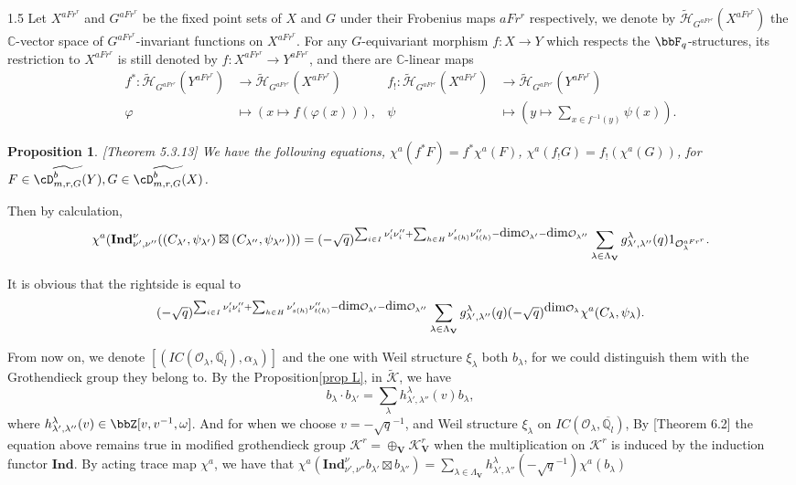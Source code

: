 \documentclass[10pt]{amsart}
\newtheorem{proposition}[theorem]{Proposition}
\def\cH{{\mathcal H}}   \def\cB{{\mathcal B}} \def\cS{{\mathcal S}} \def\fkS{{\frak S}}
\def\bbC{{\mathbb C}}  \def\bbE{{\mathbb E}}  \def\bbP{{\mathbb P}}
\def\dim{\mbox{\rm dim}}   \def\End{\mbox{\rm End}}
\def\bfV{{\mathbf V}}
\def\bfV{\mathbf{V}}
\def\Ind{\mathbf{Ind}}
\newcommand\bbq{{\mathbb Q}}
\newcommand\mk{{\mathcal{K}}}
\newcommand\mo{{\mathcal{O}}}
\begin{document}
\begin{spacing}{1.5}
Let $X^{aFr^r}$ and $G^{aFr^r}$ be the fixed point sets of $X$ and $G$ under their Frobenius maps ${aFr^r}$ respectively, we denote by $\tilde{\cH}_{G^{aFr^r}}(X^{aFr^r})$ the $\bbC$-vector space of $G^{aFr^r}$-invariant functions on $X^{aFr^r}$. For any $G$-equivariant morphism $f:X\rightarrow Y$ which respects the $\bbF_q$-structures, its restriction to $X^{aFr^r}$ is still denoted by $f:X^{aFr^r}\rightarrow Y^{aFr^r}$, and there are $\bbC$-linear maps
\begin{align*}
f^*:\tilde{\cH}_{G^{aFr^r}}(Y^{aFr^r})&\rightarrow \tilde{\cH}_{G^{aFr^r}}(X^{aFr^r}) &f_!: \tilde{\cH}_{G^{aFr^r}}(X^{aFr^r})&\rightarrow \tilde{\cH}_{G^{aFr^r}}(Y^{aFr^r})\\
\varphi&\mapsto (x\mapsto f(\varphi(x))), & \psi&\mapsto(y\mapsto \sum_{x\in f^{-1}(y)}\psi(x)).
\end{align*}

\begin{proposition}\cite{Pramod-2021}[Theorem 5.3.13]
    We have the following equations, $\chi^a(f^*F)=f^*\chi^a(F)$, $\chi^a(f_!G)=f_!(\chi^a(G))$, for $F\in \widetilde{\cD_{m,r,G}^b(Y)},G\in \widetilde{\cD_{m,r,G}^b(X)}$.
\end{proposition}
Then by calculation, $$\chi^a(\Ind_{\nu',\nu''}^{\nu}((C_{\lambda'},\psi_{\lambda'})\boxtimes (C_{\lambda''},\psi_{\lambda''})))=(-\sqrt{q})^{\sum_{i\in I}\nu_i'\nu_i''+\sum_{h\in H}\nu_{s(h)}'\nu_{t(h)}''-\dim\mo_{\lambda'}-\dim\mo_{\lambda''}}\sum_{\lambda\in \Lambda_{\bfV}}g_{\lambda',\lambda''}^{\lambda}(q)1_{\mo^{aFr^r}_{\lambda}}.$$

It is obvious that the rightside is equal to$$(-\sqrt{q})^{\sum_{i\in I}\nu_i'\nu_i''+\sum_{h\in H}\nu_{s(h)}'\nu_{t(h)}''-\dim\mo_{\lambda'}-\dim\mo_{\lambda''}}\sum_{\lambda\in \Lambda_{\bfV}}g_{\lambda',\lambda''}^{\lambda}(q)(-\sqrt{q})^{\dim\mo_{\lambda}}\chi^a(C_{\lambda},\psi_{\lambda}).$$

From now on, we denote $[(IC(\mo_{\lambda},\overline{\bbq_l}),\alpha_{\lambda})]$ and the one with Weil structure $\xi_{\lambda}$ both $b_{\lambda}$, for we could distinguish them with the Grothendieck group they belong to. By the Proposition\ref{prop L}, in $\tilde{\mk}$, we have $$b_{\lambda}\cdot b_{\lambda'}=\sum_{\lambda}h_{\lambda',\lambda''}^{\lambda}(v)b_{\lambda},$$ where $h_{\lambda',\lambda''}^{\lambda}(v)\in \bbZ[v,v^{-1},\omega]$. And for when we choose $v=-\sqrt{q}^{-1}$, and Weil structure $\xi_{\lambda}$ on $IC(\mo_{\lambda},\overline{\bbq_l})$, By \cite{lusztig1998canonical}[Theorem 6.2] the equation above remains true in modified grothendieck group $\mk^r=\oplus_{\bfV}\mk^r_{\bfV}$ when the multiplication on $\mk^r$ is induced by the induction functor $\Ind$. By acting trace map $\chi^a$, we have that $\chi^a(\Ind_{\nu',\nu''}^{\nu}b_{\lambda'}\boxtimes b_{\lambda''})=\sum_{\lambda\in \Lambda_{\bfV}}h_{\lambda',\lambda''}^{\lambda}(-\sqrt{q}^{-1})\chi^a(b_{\lambda})$  




\end{spacing}
\end{document}
